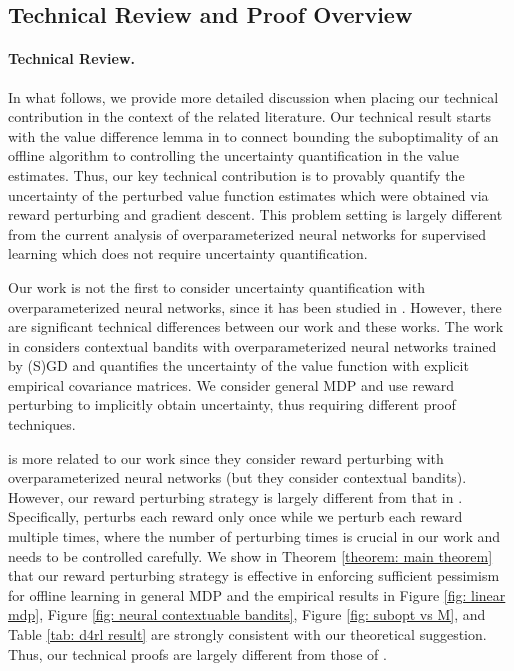 \documentclass{article} \usepackage{iclr2023/iclr2023_conference,times}
\begin{document}
\subsection{Technical Review and Proof Overview}
\label{subsection: technical review}


\paragraph{Technical Review.} In what follows, we provide more detailed discussion when placing our technical contribution in the context of the related literature. Our technical result starts with the value difference lemma in \cite{jin2021pessimism} to connect bounding the suboptimality of an offline algorithm to controlling the uncertainty quantification in the value estimates. Thus, our key technical contribution is to provably quantify the uncertainty of the perturbed value function estimates which were obtained via reward perturbing and gradient descent. This problem setting is largely different from the current analysis of overparameterized neural networks for supervised learning which does not require uncertainty quantification. 

Our work is not the first to consider uncertainty quantification with overparameterized neural networks, since it has been studied in \cite{zhou2020neural,nguyen2021offline,jia2022learning}. However, there are significant technical differences between our work and these works. The work in \cite{zhou2020neural,nguyen2021offline} considers contextual bandits with overparameterized neural networks trained by (S)GD and quantifies the uncertainty of the value function with explicit empirical covariance matrices. We consider general MDP and use reward perturbing to implicitly obtain uncertainty, thus requiring different proof techniques.

\citet{jia2022learning} is more related to our work since they consider reward perturbing with overparameterized neural networks (but they consider contextual bandits). However, our reward perturbing strategy is largely different from that in \cite{jia2022learning}. Specifically, \citet{jia2022learning} perturbs each reward only once while we perturb each reward multiple times, where the number of perturbing times is crucial in our work and needs to be controlled carefully. We show in Theorem \ref{theorem: main theorem} that our reward perturbing strategy is effective in enforcing sufficient pessimism for offline learning in general MDP and the empirical results in Figure \ref{fig: linear mdp}, Figure \ref{fig: neural contextuable bandits}, Figure \ref{fig: subopt vs M}, and Table \ref{tab: d4rl result} are strongly consistent with our theoretical suggestion. Thus, our technical proofs are largely different from those of \citet{jia2022learning}. 
\end{document}
